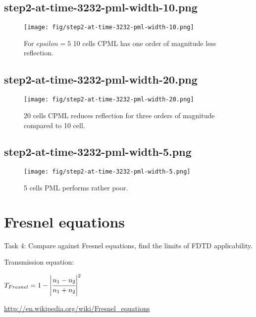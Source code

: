 \documentclass[fullscreen=true]{beamer}
\begin{document}
\subsection{step2-at-time-3232-pml-width-10.png}
\begin{frame}
  \begin{figure}
    \texttt{[image: fig/step2-at-time-3232-pml-width-10.png]}%
    \caption{For $epsilon=5$ 10 cells CPML has one order of magnitude less reflection.}
  \end{figure}
\end{frame}

\subsection{step2-at-time-3232-pml-width-20.png}
\begin{frame}
  \begin{figure}
    \texttt{[image: fig/step2-at-time-3232-pml-width-20.png]}%
    \caption{20 cells CPML reduces reflection for three orders of
      magnitude compared to 10 cell.}
  \end{figure}
\end{frame}

\subsection{step2-at-time-3232-pml-width-5.png}
\begin{frame}
  \begin{figure}
    \texttt{[image: fig/step2-at-time-3232-pml-width-5.png]}%
    \caption{5 cells PML performs rather poor.}
  \end{figure}
\end{frame}

\section{Fresnel equations}
\begin{frame}
  \begin{block}{Task 4:}
    Compare against Fresnel equations, find the
    limits of FDTD applicability.
  \end{block}
  \begin{block}{Transmission equation:}
    \begin{center}
      $T_{Fresnel} = 1-\left|\cfrac{n_1-n_2}{n_1+n_2}\right|^2$
    \end{center}
    \href{http://en.wikipedia.org/wiki/Fresnel_equations}{http://en.wikipedia.org/wiki/Fresnel\_equations}

  \end{block}
\end{frame}
\end{document}
